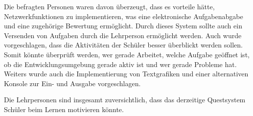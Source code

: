 Die befragten Personen waren davon überzeugt, dass es vorteile hätte, Netzwerkfunktionen zu implementieren, was eine elektronische Aufgabenabgabe und eine zugehörige Bewertung ermöglicht. Durch dieses System sollte auch ein Versenden von Aufgaben durch die Lehrperson ermöglicht werden. Auch wurde vorgeschlagen, dass die Aktivitäten der Schüler besser überblickt werden sollen. Somit könnte überprüft werden, wer gerade Arbeitet, welche Aufgabe geöffnet ist, ob die Entwicklungsumgebung gerade aktiv ist und wer gerade Probleme hat. Weiters wurde auch die Implementierung von Textgrafiken und einer alternativen Konsole zur Ein- und Ausgabe vorgeschlagen.

Die Lehrpersonen sind insgesamt zuversichtlich, dass das derzeitige Questsystem Schüler beim Lernen motivieren könnte.
